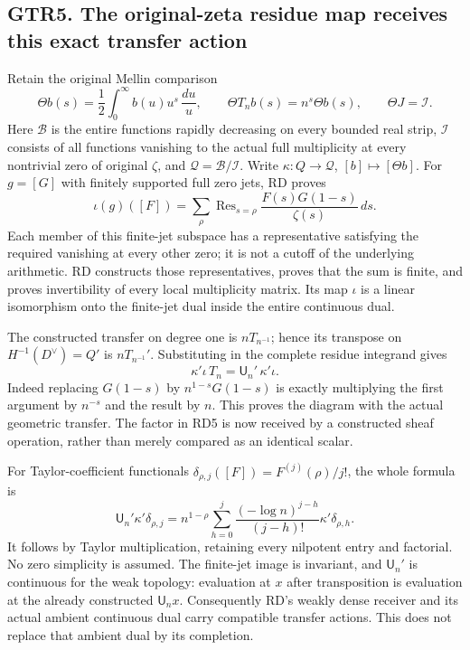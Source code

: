 \subsection{GTR5. The original-zeta residue map receives this exact
transfer
action}\label{gtr5.-the-original-zeta-residue-map-receives-this-exact-transfer-action}

Retain the original Mellin comparison \[
\Theta b(s)=\frac12\int_0^\infty b(u)u^s\,\frac{du}{u},\qquad
\Theta T_n b(s)=n^s\Theta b(s),\qquad \Theta J=\mathcal I.
\tag{GTR5.1}
\] Here \(\mathcal B\) is the entire functions rapidly decreasing on
every bounded real strip, \(\mathcal I\) consists of all functions
vanishing to the actual full multiplicity at every nontrivial zero of
original \(\zeta\), and \(\mathcal Q=\mathcal B/\mathcal I\). Write
\(\kappa:Q\to\mathcal Q\), \([b]\mapsto[\Theta b]\). For \(g=[G]\) with
finitely supported full zero jets, RD proves \[
\iota(g)([F])=\sum_{\rho}\operatorname{Res}_{s=\rho}
\frac{F(s)G(1-s)}{\zeta(s)}\,ds.
\tag{GTR5.2}
\] Each member of this finite-jet subspace has a representative
satisfying the required vanishing at every other zero; it is not a
cutoff of the underlying arithmetic. RD constructs those
representatives, proves that the sum is finite, and proves invertibility
of every local multiplicity matrix. Its map \(\iota\) is a linear
isomorphism onto the finite-jet dual inside the entire continuous dual.

The constructed transfer on degree one is \(nT_{n^{-1}}\); hence its
transpose on \(H^{-1}(D^\vee)=Q'\) is \(nT_{n^{-1}}'\). Substituting in
the complete residue integrand gives \[
\boxed{\kappa'\iota\,T_n
=\mathsf U_n'\,\kappa'\iota.}
\tag{GTR5.3}
\] Indeed replacing \(G(1-s)\) by \(n^{1-s}G(1-s)\) is exactly
multiplying the first argument by \(n^{-s}\) and the result by \(n\).
This proves the diagram with the actual geometric transfer. The factor
in RD5 is now received by a constructed sheaf operation, rather than
merely compared as an identical scalar.

For Taylor-coefficient functionals
\(\delta_{\rho,j}([F])=F^{(j)}(\rho)/j!\), the whole formula is \[
\mathsf U_n'\kappa'\delta_{\rho,j}
=n^{1-\rho}\sum_{h=0}^j
\frac{(-\log n)^{j-h}}{(j-h)!}\kappa'\delta_{\rho,h}.
\tag{GTR5.4}
\] It follows by Taylor multiplication, retaining every nilpotent entry
and factorial. No zero simplicity is assumed. The finite-jet image is
invariant, and \(\mathsf U_n'\) is continuous for the weak topology:
evaluation at \(x\) after transposition is evaluation at the already
constructed \(\mathsf U_nx\). Consequently RD's weakly dense receiver
and its actual ambient continuous dual carry compatible transfer
actions. This does not replace that ambient dual by its completion.

